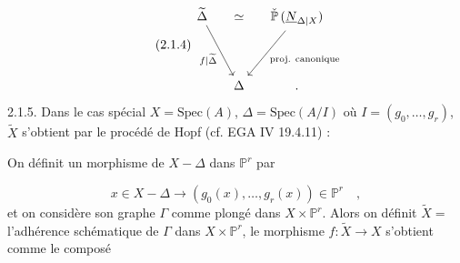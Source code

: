 \begin{equation}\tag{2.1.4}
\begin{tikzcd}[row sep=huge, column sep=small]
\widetilde{\Delta} \arrow[rd, "f|\widetilde{\Delta}"'] & \simeq & \check{\mathbb{P}}\,(\underline{N}_{\Delta|X}) \arrow[ld, "\text{proj. canonique}"] \\
{} & \Delta & .
\end{tikzcd}
\end{equation}
2.1.5. Dans le cas spécial $X = \mathrm{Spec}(A)$, $\Delta = \mathrm{Spec}(A/I)$ où $I = (g_0,\ldots,g_r)$, $\widetilde{X}$ s'obtient par le procédé de Hopf (cf. EGA IV 19.4.11) :

On définit un morphisme de $X - \Delta$ dans $\mathbb{P}^r$ par

\begin{equation*}
x \in X - \Delta \longrightarrow (g_0(x),\ldots,g_r(x)) \in \mathbb{P}^r \quad ,
\end{equation*}
et on considère son graphe $\Gamma$ comme plongé dans $X \times \mathbb{P}^r$. Alors on définit $\widetilde{X} = $ l'adhérence schématique de $\Gamma$ dans $X \times \mathbb{P}^r$, le morphisme $f : \widetilde{X} \longrightarrow X$ s'obtient comme le composé

